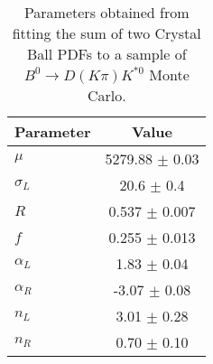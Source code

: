 \begin{table}[h]
  \centering
  \begin{tabular}{lc}
      \toprule
      Parameter & Value \\
      \midrule
      $\mu$ & 5279.88 $\pm$ 0.03 \\
      $\sigma_L$ & 20.6 $\pm$ 0.4 \\
      $R$ & 0.537 $\pm$ 0.007 \\
      $f$ & 0.255 $\pm$ 0.013 \\
      $\alpha_L$ & 1.83 $\pm$ 0.04 \\
      $\alpha_R$ & -3.07 $\pm$ 0.08 \\
      $n_L$ & 3.01 $\pm$ 0.28 \\
      $n_R$ & 0.70 $\pm$ 0.10 \\
  \bottomrule
  \end{tabular}
  \caption{Parameters obtained from fitting the sum of two Crystal Ball PDFs to a sample of $B^0 \to D(K\pi)K^{*0}$ Monte Carlo.}
\label{tab:signal_Kpi_MC_params}
\end{table}
